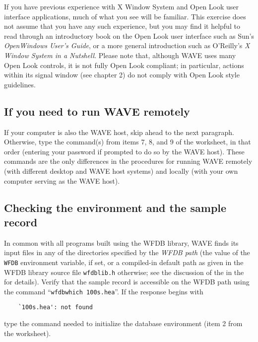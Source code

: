 \documentclass[twoside]{book}
\newcommand{\WAVE}{{\sf WAVE}\xspace}
\begin{document}
{If you have previous experience with X Window System and Open Look
user interface applications, much of what you see will be familiar.
This exercise does not assume that you have any such experience, but
you may find it helpful to read through an introductory book on the
Open Look user interface such as Sun's {\it OpenWindows User's Guide},
or a more general introduction such as O'Reilly's {\it X Window System
in a Nutshell}.  Please note that, although \WAVE{} uses many Open
Look controls, it is not fully Open Look compliant; in particular,
actions within its signal window (see chapter 2) do not comply with
Open Look style guidelines.}

\subsection*{If you need to run \WAVE{} remotely}

If your computer is also the \WAVE{} host, skip ahead to the next
paragraph.  Otherwise, type the command(s) from items 7, 8, and 9 of
the worksheet, in that order (entering your password if prompted to do
so by the \WAVE{} host).  These commands are the only differences in
the procedures for running \WAVE{} remotely (with different desktop
and \WAVE{} host systems) and locally (with your own computer serving
as the \WAVE{} host).
\index{WAVE host@\WAVE{} host}

\subsection*{Checking the environment and the sample record}

\label{sec:wfdb-path}
In common with all programs built using the WFDB library, \WAVE{} finds its
input files in any of the directories specified by the {\em WFDB path}
(the value of the {\tt WFDB} environment variable, if set, or a compiled-in
default path as given in the WFDB library source file {\tt wfdblib.h}
otherwise; see the discussion of the
in the 
for details).  Verify that the sample record is accessible on the WFDB
path using the command ``{\tt wfdbwhich 100s.hea}''.  If the response
begins with
\begin{verbatim}
    `100s.hea': not found
\end{verbatim}
\noindent
type the command needed to initialize the database environment (item 2 from
the worksheet).
\end{document}
